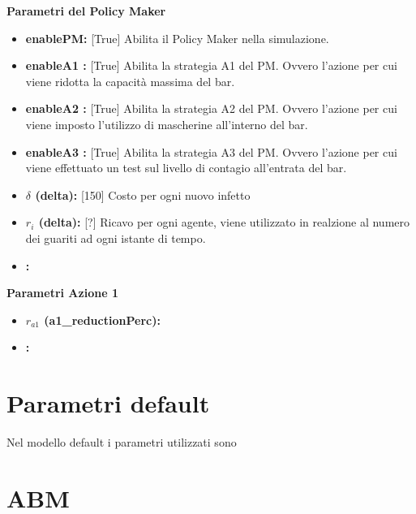 \documentclass{article}
\begin{document}
{    \textbf{Parametri del Policy Maker}
    \begin{itemize}
        \item \textbf{enablePM:} [True] Abilita il Policy Maker nella simulazione.
        \item \textbf{enableA1 :} [True] Abilita la strategia A1 del PM. Ovvero l'azione per cui viene ridotta la capacità massima del bar.
        \item \textbf{enableA2 :} [True] Abilita la strategia A2 del PM. Ovvero l'azione per cui viene imposto l'utilizzo di mascherine all'interno del bar.
        \item \textbf{enableA3 :} [True] Abilita la strategia A3 del PM. Ovvero l'azione per cui viene effettuato un test sul livello di contagio all'entrata del bar.
        \item \textbf{$\delta$ (delta):} [150] Costo per ogni nuovo infetto
        \item \textbf{$r_{i}$ (delta):} [?] Ricavo per ogni agente, viene utilizzato in realzione al numero dei guariti ad ogni istante di tempo.
        \item \textbf{ :} 
    \end{itemize}

    \textbf{Parametri Azione 1}
    \begin{itemize}
        \item \textbf{$r_{a1}$ (a1\_reductionPerc):} 
        \item \textbf{ :} 
    \end{itemize}

\section{Parametri default}
Nel modello default i parametri utilizzati sono 

\section{ABM}





\printindex




}
\end{document}
